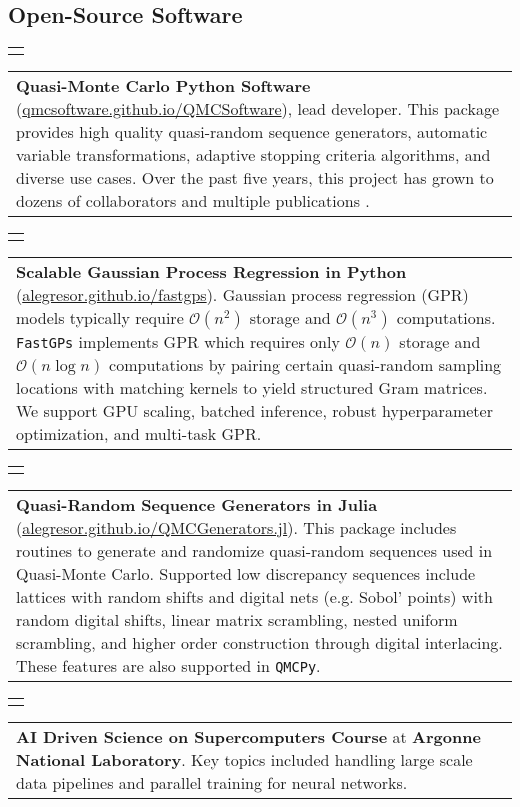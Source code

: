 \documentclass[a4paper, sans, 11pt]{moderncv}
\makeatletter
\newcommand*{\newentry}[3][.25em]{%
  \begin{tabular}[t]{@{}p{0.15\textwidth}@{\hspace{\separatorcolumnwidth}}}%
    \raggedleft\hintstyle{#2}%
  \end{tabular}%
  \begin{tabular}[t]{@{}p{\dimexpr0.85\textwidth-\separatorcolumnwidth}@{}}
     #3
  \end{tabular}%
  \par\addvspace{#1}}
\makeatother
\begin{document}
\subsection{Open-Source Software}
\newentry{\texttt{QMCPy}}{\textbf{Quasi-Monte Carlo Python Software} (\href{https://qmcsoftware.github.io/QMCSoftware}{qmcsoftware.github.io/QMCSoftware}), lead developer. This package provides high quality quasi-random sequence generators, automatic variable transformations, adaptive stopping criteria algorithms, and diverse use cases. Over the past five years, this project has grown to dozens of collaborators and multiple publications \cite{sorokin.2025.ld_randomizations_ho_nets_fast_kernel_mats,choi.challenges_great_qmc_software,choi.QMC_software,sorokin.MC_vector_functions_integrals,sorokin.QMC_IS_QMCPy,hickernell.qmc_what_why_how,jain.bernstein_betting_confidence_intervals}.}
\newentry{\texttt{FastGPs}}{\textbf{Scalable Gaussian Process Regression in Python} (\href{https://alegresor.github.io/fastgps}{alegresor.github.io/fastgps}). Gaussian process regression (GPR) models typically require $\mathcal{O}(n^2)$ storage and $\mathcal{O}(n^3)$ computations. \texttt{FastGPs} implements GPR which requires only $\mathcal{O}(n)$ storage and $\mathcal{O}(n \log n)$ computations by pairing certain quasi-random sampling locations with matching kernels to yield structured Gram matrices. We support GPU scaling, batched inference, robust hyperparameter optimization, and multi-task GPR.}
\newentry{\texttt{QMCGenerators}}{\textbf{Quasi-Random Sequence Generators in Julia} (\href{https://alegresor.github.io/QMCGenerators.jl}{{alegresor.github.io/QMCGenerators.jl}}). This package includes routines to generate and randomize quasi-random sequences used in Quasi-Monte Carlo. Supported low discrepancy sequences include lattices with random shifts and digital nets (e.g. Sobol' points) with random digital shifts, linear matrix scrambling, nested uniform scrambling, and higher order construction through digital interlacing. These features are also supported in \texttt{QMCPy}.}
\newentry{\texttt{AI on HPC}}{\textbf{AI Driven Science on Supercomputers Course} at \textbf{Argonne National Laboratory}. Key topics included handling large scale data pipelines and parallel training for neural networks. %
}
\end{document}
